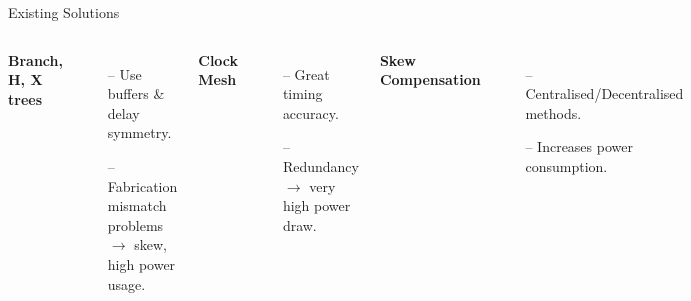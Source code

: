 \documentclass{beamer}
\begin{document}
\begin{frame}{Existing Solutions}
	\begin{columns}
		\textbf{Branch, H, X trees}
		\begin{itemize}
			\item[--]
				Use buffers \& delay symmetry.
			\item[--]
				Fabrication mismatch problems $\rightarrow$ skew, high power usage.
		\end{itemize}
		\textbf{Clock Mesh}
		\begin{itemize}
			\item[--]
				Great timing accuracy.
			\item[--]
				Redundancy $\rightarrow$ very high power draw.
		\end{itemize}
		\textbf{Skew Compensation}
        \begin{itemize}
        	\item[--]
        		Centralised/Decentralised methods.
	        \item[--]
	            Increases power consumption.
	    \end{itemize}
			\includegraphics[scale=0.4]{eldar_trees}
			\includegraphics[scale=0.4]{eldar_mesh}
			\begin{tiny}\begin{flushright}\cite{eldar}\end{flushright}\end{tiny}
	\end{columns}
 
\end{frame}
\end{document}
